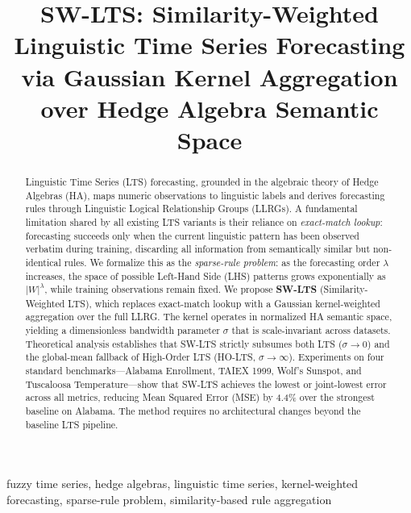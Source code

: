 \documentclass[conference]{IEEEtran}
\begin{document}
\title{SW-LTS: Similarity-Weighted Linguistic Time Series Forecasting\\
via Gaussian Kernel Aggregation over Hedge Algebra Semantic Space}

\author{
}

\maketitle

\begin{abstract}
Linguistic Time Series (LTS) forecasting, grounded in the algebraic
theory of Hedge Algebras (HA), maps numeric observations to linguistic
labels and derives forecasting rules through Linguistic Logical
Relationship Groups (LLRGs). A fundamental limitation shared by all
existing LTS variants is their reliance on \emph{exact-match lookup}:
forecasting succeeds only when the current linguistic pattern has been
observed verbatim during training, discarding all information from
semantically similar but non-identical rules. We formalize this as the
\emph{sparse-rule problem}: as the forecasting order $\lambda$ increases,
the space of possible Left-Hand Side (LHS) patterns grows exponentially
as $|W|^\lambda$, while training observations remain fixed. We propose
\textbf{SW-LTS} (Similarity-Weighted LTS), which replaces exact-match
lookup with a Gaussian kernel-weighted aggregation over the full LLRG.
The kernel operates in normalized HA semantic space, yielding a
dimensionless bandwidth parameter $\sigma$ that is scale-invariant
across datasets. Theoretical analysis establishes that SW-LTS strictly
subsumes both LTS ($\sigma \to 0$) and the global-mean fallback of
High-Order LTS (HO-LTS, $\sigma \to \infty$). Experiments on four
standard benchmarks—Alabama Enrollment, TAIEX 1999, Wolf's Sunspot,
and Tuscaloosa Temperature—show that SW-LTS achieves the lowest or
joint-lowest error across all metrics, reducing Mean Squared Error
(MSE) by 4.4\% over the strongest baseline on Alabama. The method
requires no architectural changes beyond the baseline LTS pipeline.
\end{abstract}

\begin{IEEEkeywords}
fuzzy time series, hedge algebras, linguistic time series,
kernel-weighted forecasting, sparse-rule problem, similarity-based rule aggregation
\end{IEEEkeywords}
\end{document}
